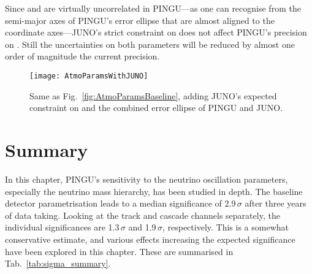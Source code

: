 Since  and  are virtually uncorrelated in PINGU---as one can
recognise from the semi-major axes of PINGU's error ellipse that are
almost aligned to the coordinate axes---JUNO's strict constraint on 
does not affect PINGU's precision on . Still the uncertainties on both
parameters will be reduced by almost one order of magnitude \wrt the current
precision.

\begin{figure}[thp]
 \centering
 \texttt{[image: AtmoParamsWithJUNO]}
 \caption{Same as Fig.~\ref{fig:AtmoParamsBaseline}, adding JUNO's
  expected constraint on  and the combined error ellipse of PINGU and
  JUNO.}
 \label{fig:AtmoParamsWithJUNO}
\end{figure}

\FloatBarrier

\section{Summary}
\label{sec:ana_summary}

In this chapter, PINGU's sensitivity to the neutrino oscillation parameters,
especially the neutrino mass hierarchy, has been studied in depth. The baseline
detector parametrisation leads to a median significance of 2.9\,$\sigma$ after
three years of data taking. Looking at the track and cascade channels
separately, the individual significances are 1.3\,$\sigma$ and 1.9\,$\sigma$,
respectively. This is a somewhat conservative estimate, and various effects
increasing the expected significance have been explored in this chapter. These
are summarised in Tab.~\ref{tab:sigma_summary}.

